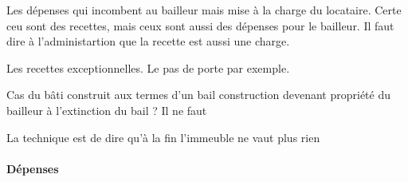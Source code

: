 				\medbreak Les dépenses qui incombent au bailleur mais mise à la charge du locataire. Certe ceu sont des recettes, mais ceux sont aussi des dépenses pour le bailleur. Il faut dire à l'administartion que la recette est aussi une charge.

				\medbreak Les recettes exceptionnelles. Le pas de porte par exemple.

				\begin{conseil}
						Cas du bâti construit aux termes d'un bail construction devenant propriété du bailleur à l'extinction du bail ?
						Il ne faut

						La technique est de dire qu'à la fin l'immeuble ne vaut plus rien
				\end{conseil}

			\paragraph{Dépenses}

